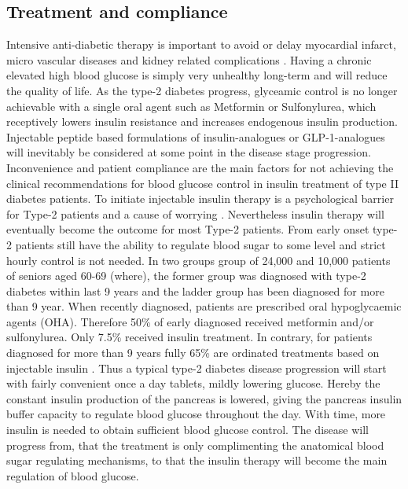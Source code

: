 \subsection{Treatment and compliance}
Intensive anti-diabetic therapy is important to avoid or delay myocardial infarct, micro vascular diseases and kidney related complications \cite{holman,boussageon2011effect,gaede2008effect}. Having a chronic elevated high blood glucose is simply very unhealthy long-term and will reduce the quality of life. As the type-2 diabetes progress, glyceamic control is no longer achievable with a single oral agent such as Metformin or Sulfonylurea, which receptively lowers insulin resistance and increases endogenous insulin production. Injectable peptide based formulations of insulin-analogues or GLP-1-analogues will inevitably be considered at some point in the disease stage progression. Inconvenience and patient compliance are the main factors for not achieving the clinical recommendations for blood glucose control in insulin treatment of type II diabetes patients. To initiate injectable insulin therapy is a psychological barrier for Type-2 patients and a cause of worrying \cite{korytkowski2002oral}. Nevertheless insulin therapy will eventually become the outcome for most Type-2 patients. From early onset type-2 patients still have the ability to regulate blood sugar to some level and strict hourly control is not needed. In two groups group of 24,000 and 10,000 patients of seniors aged 60-69 (where), the former group was diagnosed with type-2 diabetes within last 9 years and the ladder group has been diagnosed for more than 9 year. When recently diagnosed, patients are prescribed oral hypoglycaemic agents (OHA). Therefore 50\% of early diagnosed received metformin and/or sulfonylurea. Only 7.5\% received insulin treatment. In contrary, for patients diagnosed for more than 9 years fully 65\% are ordinated treatments based on injectable insulin \cite{Elbert2014rates}. Thus a typical type-2 diabetes disease progression will start with fairly convenient once a day tablets, mildly lowering glucose. Hereby the constant insulin production of the pancreas is lowered, giving the pancreas insulin buffer capacity to regulate blood glucose throughout the day. With time, more insulin is needed to obtain sufficient blood glucose control. The disease will progress from, that the treatment is only complimenting the anatomical blood sugar regulating mechanisms, to that the insulin therapy will become the main regulation of blood glucose.

